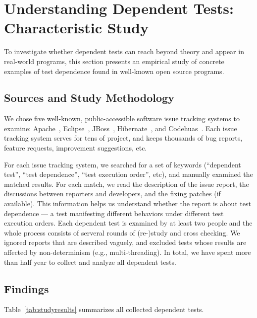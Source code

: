 \section{Understanding Dependent Tests: Characteristic Study}
\label{sec:study}

To investigate whether dependent tests can reach beyond theory
and appear in real-world programs, this section presents an empirical
study of concrete examples of test dependence found in
well-known open source programs. 


\subsection{Sources and Study Methodology}

We chose five well-known, public-accessible software issue
tracking systems to examine: Apache~\cite{apachebug},
Eclipse~\cite{eclipsebug}, JBoss~\cite{jbossbug},
Hibernate~\cite{hibernatebug}, and Codehuas~\cite{codehuasbug}.
Each issue tracking system serves for tens of project, and
keeps thousands of bug reports, feature requests, improvement
suggestions, etc.

For each issue tracking system, we searched for a set of keywords
(``dependent test'', ``test dependence'', ``test execution order'',
etc), and manually examined the matched results. For each match, we read the
description of the issue report, the discussions between reporters
and developers, and the fixing patches (if available). This information
helps us understand whether the report is about test dependence
 --- a test manifesting different behaviors under different
test execution orders. Each dependent test is examined by
at least two people and the whole process consists of serveral
rounds of (re-)study and cross checking. We ignored reports
that are described vaguely, and excluded tests whose results are
affected by non-determinism (e.g., multi-threading).
In total, we have spent more than half year to collect and analyze all dependent
tests. 


\subsection{Findings}



Table~\ref{tab:studyresults} summarizes all collected dependent tests.


